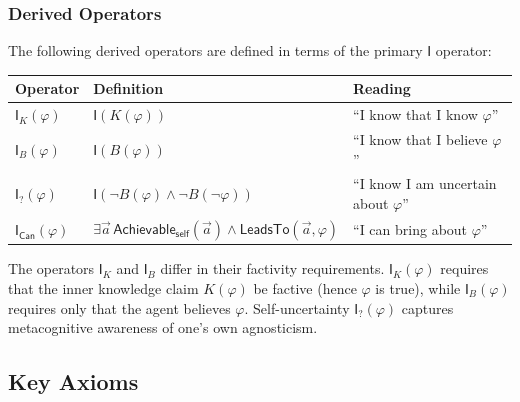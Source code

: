 \documentclass[../LogosReference.tex]{subfiles}
\begin{document}
\subsubsection{Derived Operators}

The following derived operators are defined in terms of the primary $\mathsf{I}$ operator:

\begin{center}
\begin{tabular}{lll}
\toprule
\textbf{Operator} & \textbf{Definition} & \textbf{Reading} \\
\midrule
$\mathsf{I}_K(\varphi)$ & $\mathsf{I}(K(\varphi))$ & ``I know that I know $\varphi$'' \\
$\mathsf{I}_B(\varphi)$ & $\mathsf{I}(B(\varphi))$ & ``I know that I believe $\varphi$'' \\
$\mathsf{I}_?(\varphi)$ & $\mathsf{I}(\neg B(\varphi) \land \neg B(\neg\varphi))$ & ``I know I am uncertain about $\varphi$'' \\
$\mathsf{I}_{\mathsf{Can}}(\varphi)$ & $\exists \vec{a}\, \mathsf{Achievable}_{\mathsf{self}}(\vec{a}) \land \mathsf{LeadsTo}(\vec{a}, \varphi)$ & ``I can bring about $\varphi$'' \\
\bottomrule
\end{tabular}
\end{center}

\begin{remark}
The operators $\mathsf{I}_K$ and $\mathsf{I}_B$ differ in their factivity requirements.
$\mathsf{I}_K(\varphi)$ requires that the inner knowledge claim $K(\varphi)$ be factive (hence $\varphi$ is true),
while $\mathsf{I}_B(\varphi)$ requires only that the agent believes $\varphi$.
Self-uncertainty $\mathsf{I}_?(\varphi)$ captures metacognitive awareness of one's own agnosticism.
\end{remark}


\subsection{Key Axioms}\label{sec:reflection-axioms}
\end{document}
